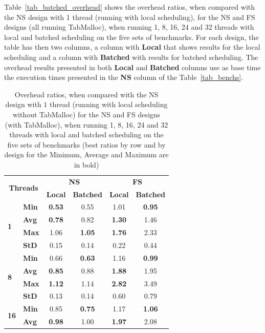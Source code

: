 \documentclass{llncs}
\begin{document}
Table~\ref{tab_batched_overhead} shows the overhead ratios, when
compared with the NS design with 1 thread (running with local
scheduling), for the NS and FS designs (all running TabMalloc), when
running 1, 8, 16, 24 and 32 threads with local and batched scheduling
on the five sets of benchmarks. For each design, the table has then
two columns, a column with {\bf Local} that shows results for the
local scheduling and a column with {\bf Batched} with results for
batched scheduling. The overhead results presented in both {\bf Local}
and {\bf Batched} columns use as base time the execution times
presented in the {\bf NS} column of the Table~\ref{tab_benchs}.

\setlength{\tabcolsep}{12pt}

\begin{table}[!ht]
\centering
\caption{Overhead ratios, when compared with the NS design with $1$
  thread (running with local scheduling without TabMalloc) for the NS
  and FS designs (with TabMalloc), when running 1, 8, 16, 24 and 32
  threads with local and batched scheduling on the five sets of
  benchmarks (best ratios by row and by design for the Minimum,
  Average and Maximum are in bold)}
\begin{tabular}{ll|cc|cc}
\hline\hline
\multicolumn{2}{c|}{\multirow{2}{*}{\bf Threads}} &
\multicolumn{2}{c|}{\multirow{1}{*}{\bf NS}} &
\multicolumn{2}{|c}{\multirow{1}{*}{\bf FS}}\\ \cline{3-6}
& 
& \multicolumn{1}{c}{\bf Local}
& \multicolumn{1}{c}{\bf Batched}
& \multicolumn{1}{|c}{\bf Local}
& \multicolumn{1}{c}{\bf Batched}\\
\hline
\multirow{4}{*}{\bf 1}
& {\bf Min }& {\bf 0.53}& 0.55& 1.01& {\bf 0.95}\\
& {\bf Avg }& {\bf 0.78}& 0.82& {\bf 1.30}& 1.46\\
& {\bf Max }& 1.06& {\bf 1.05}& {\bf 1.76}& 2.33\\
& {\bf StD }& 0.15& 0.14& 0.22& 0.44\\
\hline
\multirow{4}{*}{\bf 8}
& {\bf Min }& 0.66& {\bf 0.63}& 1.16&{\bf  0.99}\\
& {\bf Avg }& {\bf 0.85}& 0.88& {\bf 1.88}& 1.95\\
& {\bf Max }& {\bf 1.12}& 1.14& {\bf 2.82}& 3.49\\
& {\bf StD }& 0.13& 0.14& 0.60& 0.79\\
\hline
\multirow{4}{*}{\bf 16}
& {\bf Min }& 0.85& {\bf 0.75}& 1.17& {\bf 1.06}\\
& {\bf Avg }& {\bf 0.98}& 1.00& {\bf 1.97}& 2.08\\

\end{tabular}
\end{table}
\end{document}
